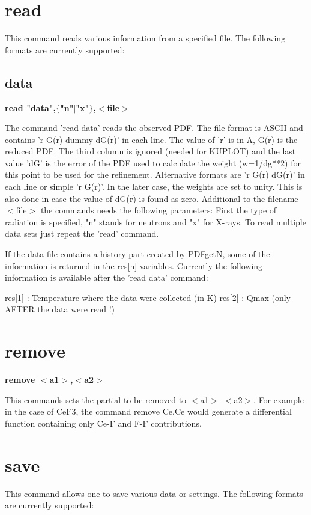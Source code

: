 \section{read}
This command reads various information from a specified file. 
The following formats are currently supported: 
\subsection*{data}
{\bf read "data",$ \{$"n"$| $"x"$\} $,$ <$file$> $ \par }
\par
\vspace{3pt}
The command 'read data' reads the observed PDF. The file 
format is ASCII and contains 'r G(r) dummy dG(r)' in each line. 
The value of 'r' is in A, G(r) is the reduced PDF. The 
third column is ignored (needed for KUPLOT) and the last 
value 'dG' is the error of the PDF used to calculate the 
weight (w=1/dg**2) for this point to be used for the 
refinement. Alternative formats are 'r G(r) dG(r)' in each 
line or simple 'r G(r)'. In the later case, the weights are 
set to unity. This is also done in case the value of dG(r) 
is found as zero. Additional to the filename $ <$file$> $ the commands 
needs the following parameters: First the type of radiation 
is specified, "n" stands for neutrons and "x" for X-rays. 
To read multiple data sets just repeat the 'read' command. 
\par
If the data file contains a history part created by PDFgetN, 
some of the information is returned in the res[n] variables. 
Currently the following information is available after the 
'read data' command: 
\par
\begin{MacVerbatim}
res[1]   : Temperature where the data were collected (in K)
res[2]   : Qmax (only AFTER the data were read !)
\end{MacVerbatim}
\section{remove}
{\bf remove $ <$a1$> $,$ <$a2$> $ \par }
\par
\vspace{3pt}
This commands sets the partial to be removed to $ <$a1$> $-$ <$a2$> $. For 
example in the case of CeF3, the command remove Ce,Ce would 
generate a differential function containing only Ce-F and F-F 
contributions. 
\section{save}
This command allows one to save various data or settings. 
The following formats are currently supported: 

